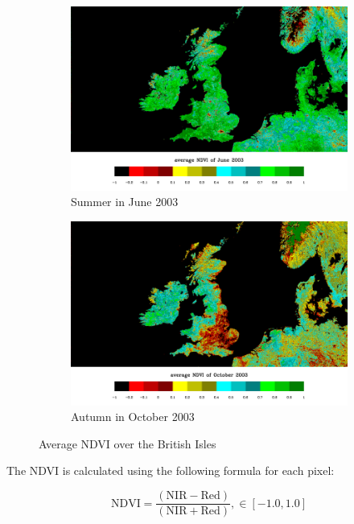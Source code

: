 \begin{figure}[H]
\begin{subfigure}{0.5\textwidth}
\centering
\includegraphics[scale=0.25]{images/NDVI_062003.png}
\caption{Summer in June 2003}
\end{subfigure}
\begin{subfigure}{0.5\textwidth}
\centering
\includegraphics[scale=0.25]{images/NDVI_102003.png}
\caption{Autumn in October 2003}
\end{subfigure}
\caption{Average NDVI over the British Isles \cite{ndvi_wiki}}
\label{fig:ndvi_british}
\end{figure}

The NDVI is calculated using the following formula for each pixel:

\begin{equation}\label{eq:ndvi}
{\displaystyle{\mbox{NDVI}}={\frac {({\mbox{NIR}}-{\mbox{Red}})}{({\mbox{NIR}}+{\mbox{Red}})}}}, \in [-1.0, 1.0]
\end{equation}

